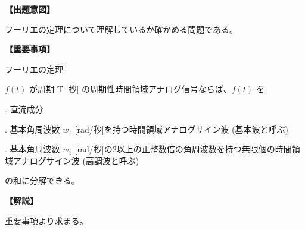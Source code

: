 \noindent \textbf{【出題意図】}

\noindent フーリエの定理について理解しているか確かめる問題である。

\vspace{1em}
\noindent \textbf{【重要事項】}

\noindent フーリエの定理

\smallskip
$f(t)$ が周期 $\textrm{T}$ [秒] の周期性時間領域アナログ信号ならば、$f(t)$ を

. 直流成分

. 基本角周波数 $w_1$ [rad/秒]を持つ時間領域アナログサイン波 (基本波と呼ぶ)

. 基本角周波数 $w_1$ [rad/秒]の2以上の正整数倍の角周波数を持つ無限個の時間領域アナログサイン波 (高調波と呼ぶ)

\smallskip
の和に分解できる。


\vspace{1em}
\noindent \textbf{【解説】}

\noindent 重要事項より求まる。
